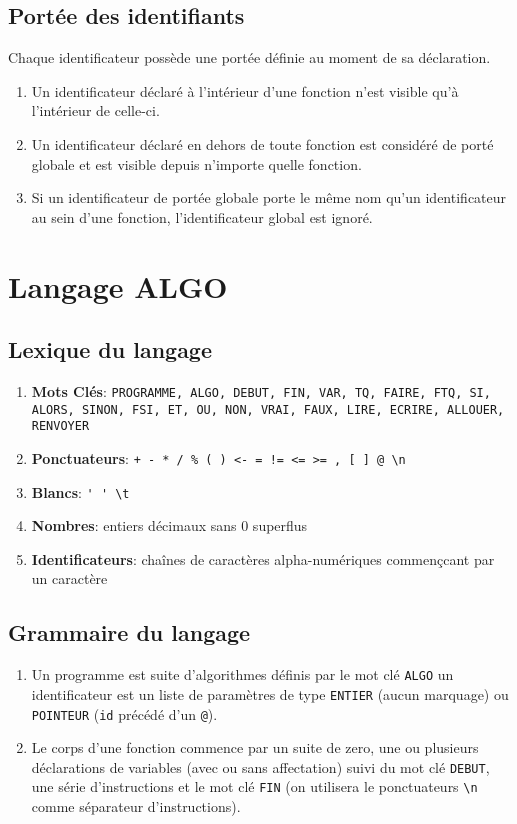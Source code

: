 \documentclass[a4paper,10pt, oneside]{article}
\begin{document}
\subsection*{Portée des identifiants}

Chaque identificateur possède une portée définie au moment de sa
déclaration.

\begin{enumerate}
\item Un identificateur déclaré à l'intérieur d'une fonction n'est
  visible qu'à l'intérieur de celle-ci. 
\item Un identificateur déclaré en dehors de toute fonction est
  considéré de porté globale et est visible depuis n'importe quelle
  fonction.
\item Si un identificateur de portée globale porte le même nom qu'un
  identificateur au sein d'une fonction, l'identificateur global est
  ignoré.
\end{enumerate}


\section*{Langage ALGO}

\subsection*{Lexique du langage}


\begin{enumerate}
\item \textbf{Mots Clés}: \texttt{PROGRAMME, ALGO, DEBUT, FIN, VAR,
    TQ, FAIRE, FTQ, SI, ALORS, SINON, FSI, ET, OU, NON, VRAI,
    FAUX, LIRE, ECRIRE, ALLOUER, RENVOYER}
\item \textbf{Ponctuateurs}: \texttt{+ - * /  \% ( ) <-  = != <= >= , [ ] @ \textbackslash n} 
\item \textbf{Blancs}: \verb|' ' \t|
\item \textbf{Nombres}: entiers décimaux sans 0 superflus
\item \textbf{Identificateurs}: chaînes de caractères alpha-numériques
  commençcant par un caractère
\end{enumerate}

\subsection*{Grammaire du langage}


\begin{enumerate}
\item Un programme est suite d'algorithmes définis par le mot clé
  \texttt{ALGO} un identificateur est un liste de paramètres de type
  \texttt{ENTIER} (aucun marquage) ou \texttt{POINTEUR} (\texttt{id}
  précédé d'un \texttt{@}).
\item Le corps d'une fonction commence par un suite de zero, une ou
  plusieurs déclarations de variables (avec ou sans affectation) suivi
  du mot clé \texttt{DEBUT}, une série d'instructions et le mot clé
  \texttt{FIN} (on utilisera le ponctuateurs \texttt{\textbackslash n}
  comme séparateur d'instructions).
\end{enumerate}
\end{document}
